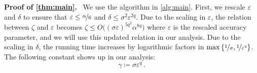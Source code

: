 \documentclass[11pt]{article}
\theoremstyle{plain}
\theoremstyle{definition}
\theoremstyle{remark}
\newcommand{\binparen}[1]{\big(#1\big)}
\newcommand{\inbrace}[1]{\left\{#1\right\}}
\newcommand{\nfrac}[2]{\nicefrac{#1}{#2}}
\newcommand{\eps}{\varepsilon}
\renewcommand{\paragraph}[1]{\medskip \noindent\textbf{#1}~}
\begin{document}
    \paragraph{Proof of \cref{thm:main}.}
        We use the algorithm in \cref{alg:main}.
        First, we rescale $\eps$ and $\delta$ to ensure that $\eps\leq \nfrac{\alpha}{6}$ and $\delta\leq \sigma^2\eps^{2q}$. %
        Due to the scaling in $\eps$, the relation between $\zeta$ and $\eps$ becomes $\zeta\leq O\binparen{(\sigma\eps)^{5q^2}\alpha^{8q}}$ where $\eps$ is the rescaled accuracy parameter, and we will use this updated relation in our analysis.
        Due to the scaling in $\delta$, the running time increases by logarithmic factors in $\max\inbrace{\nfrac{1}{\sigma},\nfrac{1}{\eps^q}}$.
        The following constant shows up in our analysis:
        \[
            \gamma \coloneqq \sigma \eps^q\,.
        \]
\end{document}
